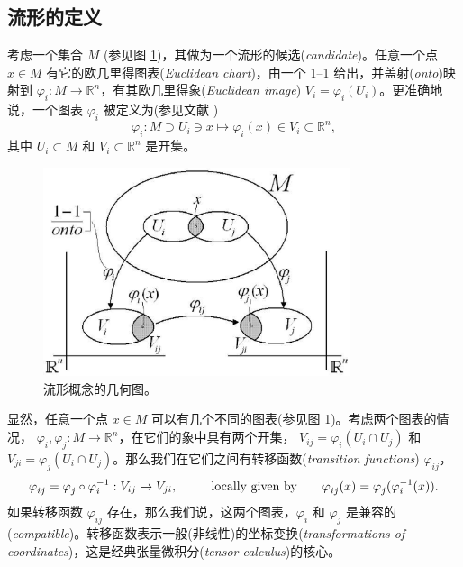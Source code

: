 \documentclass[11pt,fontset=founder]{ctexart}
\begin{document}
\subsection{流形的定义}

考虑一个集合 $M$ (参见图 \ref{Manifold1})，其做为一个流形的候选(\emph{candidate})。任意一个点 $x\in M$ 有它的欧几里得图表(\textit{Euclidean chart})，由一个 1--1 给出，并盖射(\emph{onto})映射到 $\varphi _{i}:M\rightarrow \mathbb{R}^{n}$，有其欧几里得象(\textit{Euclidean image}) $V_{i}=\varphi _{i}(U_{i})$。更准确地说，一个图表 $\varphi _{i}$ 被定义为(参见文献 \cite{GaneshSprBig,GaneshADG})
\begin{equation*}
\varphi _{i}:M\supset U_{i}\ni x\mapsto \varphi _{i}(x)\in V_{i}\subset
\mathbb{R}^{n},
\end{equation*}%
其中 $U_{i}\subset M$ 和 $V_{i}\subset \mathbb{R}^{n}$ 是开集。
\begin{figure}[h]
\centerline{\includegraphics[width=9cm]{Manifold1}}
\caption{流形概念的几何图。}
\label{Manifold1}
\end{figure}

显然，任意一个点 $x\in M$ 可以有几个不同的图表(参见图 \ref{Manifold1})。考虑两个图表的情况， $\varphi _{i},\varphi
_{j}:M\rightarrow \mathbb{R}^{n}$，在它们的象中具有两个开集， $V_{ij}=\varphi _{i}(U_{i}\cap U_{j})$ 和 $V_{ji}=\varphi _{j}(U_{i}\cap
U_{j})$。那么我们在它们之间有转移函数(\textit{transition functions}) $\varphi _{ij}$，
\begin{equation*}
\varphi _{ij}=\varphi _{j}\circ \varphi _{i}^{-1}:V_{ij}\rightarrow
V_{ji},\qquad \text{locally given by\qquad }\varphi _{ij}(x)=\varphi
_{j}(\varphi _{i}^{-1}(x)).
\end{equation*}
如果转移函数 $\varphi _{ij}$ 存在，那么我们说，这两个图表，$\varphi _{i}$ 和 $\varphi _{j}$ 是兼容的(\emph{compatible})。转移函数表示一般(非线性)的坐标变换(\emph{transformations of coordinates})，这是经典张量微积分(\emph{tensor calculus})的核心。
\end{document}
